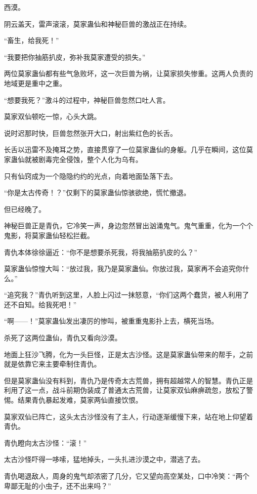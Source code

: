 
\begin{this_body}

西漠。

阴云盖天，雷声滚滚，莫家蛊仙和神秘巨兽的激战正在持续。

“畜生，给我死！”

“我要把你抽筋扒皮，弥补我莫家遭受的损失。”

两位莫家蛊仙都有些气急败坏，这一次巨兽为祸，让莫家损失惨重。这两人负责的地域更是重中之重。

“想要我死？”激斗的过程中，神秘巨兽忽然口吐人言。

莫家双仙顿吃一惊，心头大跳。

说时迟那时快，巨兽忽然张开大口，射出紫红色的长舌。

长舌以迅雷不及掩耳之势，直接贯穿了一位莫家蛊仙的身躯。几乎在瞬间，这位莫家蛊仙就被剧毒完全侵蚀，整个人化为乌有。

只有仙窍成为一个隐隐约约的光点，向着地面坠落下去。

“你是太古传奇！？”仅剩下的莫家蛊仙惊骇欲绝，慌忙撤退。

但已经晚了。

神秘巨兽正是青仇，它冷笑一声，身边忽然冒出汹涌鬼气。鬼气重重，化为一个个鬼影，将莫家蛊仙轻松拦截。

青仇本体徐徐逼近：“你不是想要杀死我，将我抽筋扒皮的么？”

莫家蛊仙惊惶大叫：“放过我，我乃是莫家蛊仙。你放过我，莫家再不会追究你什么。”

“追究我？”青仇听到这里，人脸上闪过一抹怒意，“你们这两个蠢货，被人利用了还不自知。给我死吧！”

“啊——！”莫家蛊仙发出凄厉的惨叫，被重重鬼影扑上去，横死当场。

杀死了这两位蛊仙，青仇又看向沙漠。

地面上狂沙飞腾，化为一头巨怪，正是太古沙怪。这是莫家蛊仙带来的帮手，之前就是依靠它来主要牵制住青仇。

但是莫家蛊仙没有料到，青仇乃是传奇太古荒兽，拥有超越常人的智慧。青仇正是利用了这一点，战斗前期伪装成了普通太古荒兽，让莫家双仙麻痹疏忽，放松了警惕。结果青仇暴起发难，莫家两仙直接饮恨。

莫家双仙已阵亡，这头太古沙怪没有了主人，行动逐渐缓慢下来，站在地上仰望着青仇。

青仇瞪向太古沙怪：“滚！”

太古沙怪吓得一哆嗦，猛地掉头，一头扎进沙漠之中，潜逃了去。

青仇喝退敌人，周身的鬼气却浓密了几分，它又望向高空某处，口中冷笑：“两个卑鄙无耻的小虫子，还不出来吗？”


\end{this_body}

